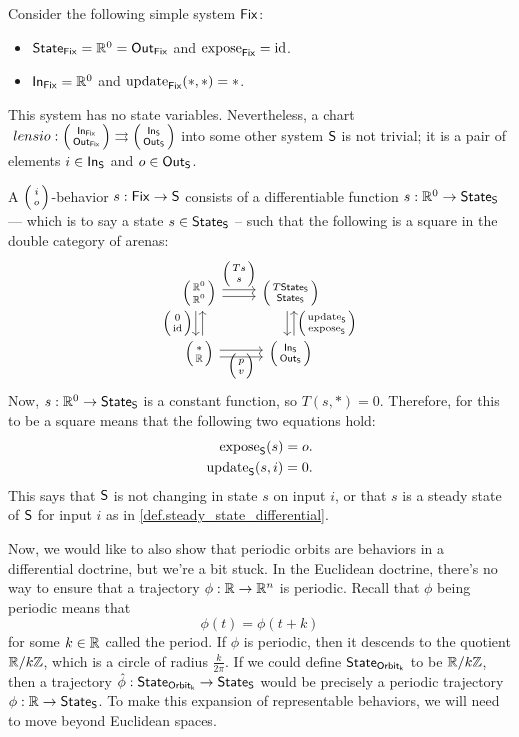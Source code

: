 \documentclass[DynamicalBook]{subfiles}
\begin{document}
\begin{example}
  Consider the following simple system $\mathsf{Fix}$:
  \begin{itemize}
\item $\mathsf{State}_{\mathsf{Fix}} = \mathbb{R}^0 = \mathsf{Out}_{\mathsf{Fix}}$ and $\mathrm{expose}_{\mathsf{Fix}} = \mathrm{id}$.
\item $\mathsf{In}_{\mathsf{Fix}} = \mathbb{R}^0$ and $\mathrm{update}_{\mathsf{Fix}}(\ast, \ast) = \ast$.
\end{itemize}
This system has no state variables. Nevertheless, a chart $\
lens{i}{o} : \lens{\In{Fix}}{\Out{Fix}} \rightrightarrows
\lens{\In{S}}{\Out{S}}$ into some other system $\mathsf{S}$ is not trivial; it is a
pair of elements $i \in \mathsf{In}_{\mathsf{S}}$ and $o \in \mathsf{Out}_{\mathsf{S}}$.

A $\lens{i}{o}$-behavior $s : \mathsf{Fix} \to \mathsf{S}$ consists of a
differentiable function $s : \mathbb{R}^0 \to \mathsf{State}_{\mathsf{S}}$ --- which is to say a state
$s \in \mathsf{State}_{\mathsf{S}}$ -- such that the following is a square in the double category of
arenas:
\[
    \begin{tikzcd}
      \lens{\rr^0}{\rr^0} \ar[r, shift left, "\lens{Ts}{s}"] \ar[r, shift right] \ar[d, shift right,
      "\lens{0}{\id}"'] \ar[d, shift left, leftarrow] &
      \lens{T\State{S}}{\State{S}} \ar[d, shift left, leftarrow,
      "\lens{\update{S}}{\expose{S}}"] \ar[d, shift right]\\
      \lens{{\ast}}{\rr} \ar[r, shift right] \ar[r,
      shift left, "\lens{p}{v}"'] & \lens{\In{S}}{\Out{S}}
    \end{tikzcd}
\]
Now, $s : \mathbb{R}^0 \to \mathsf{State}_{\mathsf{S}}$ is a constant function, so $T(s, \ast) = 0$.
Therefore, for this to be a square means that the following two equations hold:
\begin{align*}
\mathrm{expose}_{\mathsf{S}}(s) = o. \\
\mathrm{update}_{\mathsf{S}}(s, i) = 0.
\end{align*}
This says that $\mathsf{S}$ is not changing in state $s$ on input $i$, or that $s$
is a steady state of $\mathsf{S}$ for input $i$ as in \cref{def.steady_state_differential}.
\end{example}

Now, we would like to also show that periodic orbits are behaviors in a
differential doctrine, but we're a bit stuck. In the Euclidean doctrine, there's
no way to ensure that a trajectory $\phi : \mathbb{R} \to \mathbb{R}^n$ is periodic. Recall
that $\phi$ being periodic means that 
$$\phi(t) = \phi(t + k)$$
for some $k \in \mathbb{R}$ called the period. If $\phi$ is periodic, then it descends
to the quotient $\mathbb{R} / k\mathbb{Z}$, which is a circle of radius $\frac{k}{2\pi}$. If
we could define $\mathsf{State}_{\mathsf{Orbit_k}}$ to be $\mathbb{R} / k\mathbb{Z}$, then a trajectory $\hat{\phi} :
\mathsf{State}_{\mathsf{Orbit_k}} \to \mathsf{State}_{\mathsf{S}}$ would be precisely a periodic trajectory $\phi :
\mathbb{R} \to \mathsf{State}_{\mathsf{S}}$. To make this expansion of representable behaviors, we will
need to move beyond Euclidean spaces.
\end{document}
